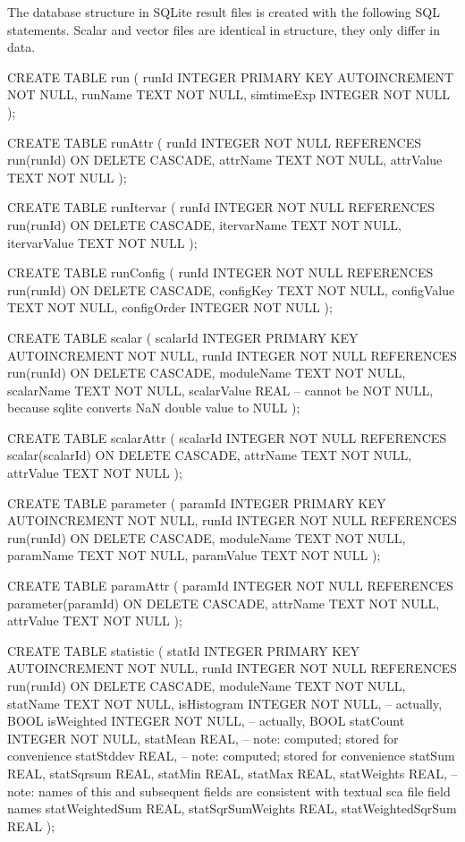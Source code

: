The database structure in SQLite result files is created with the
following SQL statements. Scalar and vector files are identical in
structure, they only differ in data.

\begin{filelisting}
CREATE TABLE run
(
    runId       INTEGER PRIMARY KEY AUTOINCREMENT NOT NULL,
    runName     TEXT NOT NULL,
    simtimeExp  INTEGER NOT NULL
);

CREATE TABLE runAttr
(
    runId       INTEGER  NOT NULL REFERENCES run(runId) ON DELETE CASCADE,
    attrName    TEXT NOT NULL,
    attrValue   TEXT NOT NULL
);

CREATE TABLE runItervar
(
    runId       INTEGER  NOT NULL REFERENCES run(runId) ON DELETE CASCADE,
    itervarName TEXT NOT NULL,
    itervarValue TEXT NOT NULL
);

CREATE TABLE runConfig
(
    runId       INTEGER NOT NULL REFERENCES run(runId) ON DELETE CASCADE,
    configKey   TEXT NOT NULL,
    configValue TEXT NOT NULL,
    configOrder INTEGER NOT NULL
);

CREATE TABLE scalar
(
    scalarId      INTEGER PRIMARY KEY AUTOINCREMENT NOT NULL,
    runId         INTEGER  NOT NULL REFERENCES run(runId) ON DELETE CASCADE,
    moduleName    TEXT NOT NULL,
    scalarName    TEXT NOT NULL,
    scalarValue   REAL        -- cannot be NOT NULL, because sqlite converts NaN double value to NULL
);

CREATE TABLE scalarAttr
(
    scalarId      INTEGER  NOT NULL REFERENCES scalar(scalarId) ON DELETE CASCADE,
    attrName      TEXT NOT NULL,
    attrValue     TEXT NOT NULL
);

CREATE TABLE parameter
(
    paramId       INTEGER PRIMARY KEY AUTOINCREMENT NOT NULL,
    runId         INTEGER  NOT NULL REFERENCES run(runId) ON DELETE CASCADE,
    moduleName    TEXT NOT NULL,
    paramName     TEXT NOT NULL,
    paramValue    TEXT NOT NULL
);

CREATE TABLE paramAttr
(
    paramId       INTEGER  NOT NULL REFERENCES parameter(paramId) ON DELETE CASCADE,
    attrName      TEXT NOT NULL,
    attrValue     TEXT NOT NULL
);

CREATE TABLE statistic
(
    statId        INTEGER PRIMARY KEY AUTOINCREMENT NOT NULL,
    runId         INTEGER NOT NULL REFERENCES run(runId) ON DELETE CASCADE,
    moduleName    TEXT NOT NULL,
    statName      TEXT NOT NULL,
    isHistogram   INTEGER NOT NULL,   -- actually, BOOL
    isWeighted    INTEGER NOT NULL,   -- actually, BOOL
    statCount     INTEGER NOT NULL,
    statMean      REAL,   -- note: computed; stored for convenience
    statStddev    REAL,   -- note: computed; stored for convenience
    statSum       REAL,
    statSqrsum    REAL,
    statMin       REAL,
    statMax       REAL,
    statWeights          REAL,  -- note: names of this and subsequent fields are consistent with textual sca file field names
    statWeightedSum      REAL,
    statSqrSumWeights    REAL,
    statWeightedSqrSum   REAL
);


\end{filelisting}
